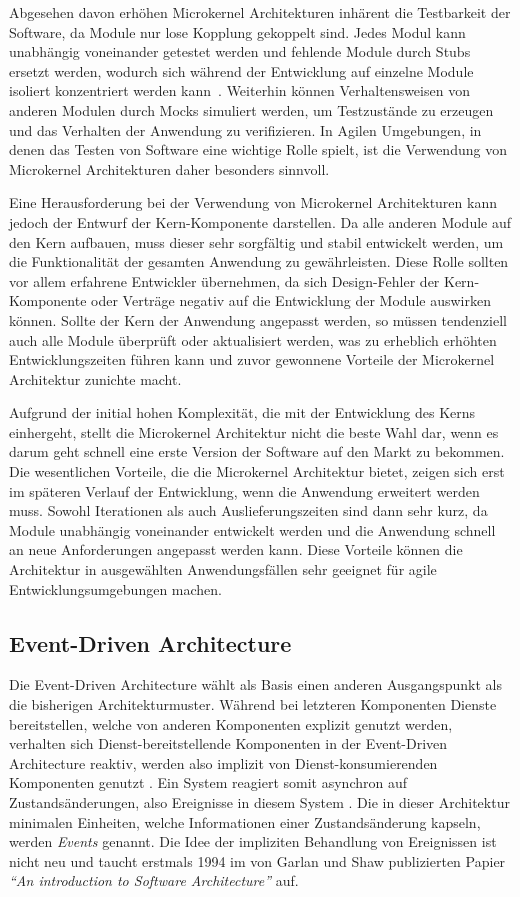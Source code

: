 \documentclass[acmtog]{acmart}
\begin{document}
Abgesehen davon erhöhen Microkernel Architekturen inhärent die Testbarkeit der Software, da Module nur lose Kopplung gekoppelt sind.
Jedes Modul kann unabhängig voneinander getestet werden und fehlende Module durch Stubs ersetzt werden, wodurch sich während der Entwicklung auf einzelne Module isoliert konzentriert werden kann~\cite[26]{architecturePatterns}.
Weiterhin können Verhaltensweisen von anderen Modulen durch Mocks simuliert werden, um Testzustände zu erzeugen und das Verhalten der Anwendung zu verifizieren.
In Agilen Umgebungen, in denen das Testen von Software eine wichtige Rolle spielt, ist die Verwendung von Microkernel Architekturen daher besonders sinnvoll.

Eine Herausforderung bei der Verwendung von Microkernel Architekturen kann jedoch der Entwurf der Kern-Komponente darstellen.
Da alle anderen Module auf den Kern aufbauen, muss dieser sehr sorgfältig und stabil entwickelt werden, um die Funktionalität der gesamten Anwendung zu gewährleisten.
Diese Rolle sollten vor allem erfahrene Entwickler übernehmen, da sich Design-Fehler der Kern-Komponente oder Verträge negativ auf die Entwicklung der Module auswirken können.
Sollte der Kern der Anwendung angepasst werden, so müssen tendenziell auch alle Module überprüft oder aktualisiert werden, was zu erheblich erhöhten Entwicklungszeiten führen kann und zuvor gewonnene Vorteile der Microkernel Architektur zunichte macht.

Aufgrund der initial hohen Komplexität, die mit der Entwicklung des Kerns einhergeht, stellt die Microkernel Architektur nicht die beste Wahl dar, wenn es darum geht schnell eine erste Version der Software auf den Markt zu bekommen.
Die wesentlichen Vorteile, die die Microkernel Architektur bietet, zeigen sich erst im späteren Verlauf der Entwicklung, wenn die Anwendung erweitert werden muss.
Sowohl Iterationen als auch Auslieferungszeiten sind dann sehr kurz, da Module unabhängig voneinander entwickelt werden und die Anwendung schnell an neue Anforderungen angepasst werden kann.
Diese Vorteile können die Architektur in ausgewählten Anwendungsfällen sehr geeignet für agile Entwicklungsumgebungen machen.

\subsection{Event-Driven Architecture}
Die Event-Driven Architecture wählt als Basis einen anderen Ausgangspunkt als die bisherigen Architekturmuster.
Während bei letzteren Komponenten Dienste bereitstellen, welche von anderen Komponenten explizit genutzt werden,
verhalten sich Dienst-bereitstellende Komponenten in der Event-Driven Architecture reaktiv,
werden also implizit von Dienst-konsumierenden Komponenten genutzt \cite{garlanShawImplizit}.
Ein System reagiert somit asynchron auf Zustandsänderungen, also Ereignisse in diesem System \cite{eda}.
Die in dieser Architektur minimalen Einheiten, welche Informationen einer Zustandsänderung kapseln, werden \textit{Events} genannt.
Die Idee der impliziten Behandlung von Ereignissen ist nicht neu und taucht erstmals 1994 im von Garlan und Shaw publizierten Papier
\textit{\enquote{An introduction to Software Architecture}} auf.
\end{document}
